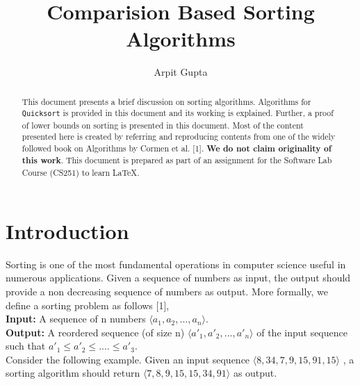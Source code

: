 \documentclass[a4paper,10pt,twocolumn]{article}
\title{Comparision Based Sorting Algorithms}
\author{Arpit Gupta }
\date{}
\begin{document}
\maketitle
\begin{abstract}
This document presents a brief discussion on sorting algorithms. Algorithms for \texttt{Quicksort} is provided in this document and its working is explained. Further, a proof of lower bounds on sorting is presented in this document. Most of the content presented here is created by referring and reproducing contents from one of the widely followed book on Algorithms by Cormen et al. [1]. \textbf{We do not claim originality of this work}. This document is prepared as part of an assignment for the Software Lab Course (CS251) to learn \LaTeX.\\
\noindent{}

\end{abstract} 
\section{Introduction}
Sorting is one of the most fundamental operations in computer science useful in numerous applications. Given a sequence of numbers as input, the output should provide a non decreasing sequence of numbers as output. More formally, we define a sorting problem as follows [1],\\
\textbf{Input:} A sequence of n numbers $\big \langle a_1,a_2 ,...,a_n\big \rangle$.\\
\textbf{Output:} A reordered sequence (of size n) $\big \langle a'_1,a'_2 ,...,a'_n \big \rangle$ of the input sequence such that $a'_1 \leq a'_2
\leq ....\leq a'_3$.\\
Consider the following example. Given an input sequence $\big \langle 8,34,7,9,15,91,15\big \rangle$ , a sorting algorithm should return $\big \langle 7,8,9,15,15,34,91\big \rangle$ as output.
\end{document}
